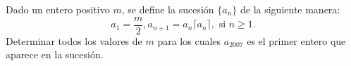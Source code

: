 Dado un entero positivo $m$, se define la sucesión $\{ a_n \}$ de la siguiente manera:
\[ a_1 = \frac{m}{2}, a_{n+1} = a_n \lceil a_n \rceil, \text{ si } n \geq 1. \]
Determinar todos los valores de $m$ para los cuales $a_{2007}$ es el primer entero que aparece en la sucesión. \newline 
